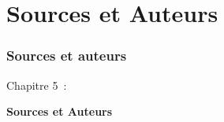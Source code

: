 %

\section{Sources et Auteurs}
\begin{frame}[fragile]
	\frametitle{Sources et auteurs}

	\begin{center}\huge{Chapitre 5~:}\end{center}
	\begin{center}\huge{\color{typo3darkgrey}\textbf{Sources et Auteurs}}\end{center}

\end{frame}


